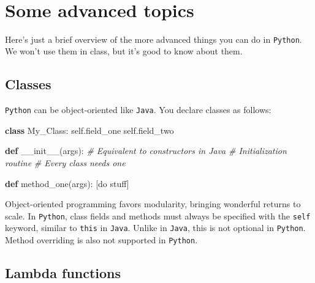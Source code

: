 \documentclass{article}
\newenvironment{Shaded}{}{}
\newcommand{\KeywordTok}[1]{\textcolor[rgb]{0.00,0.44,0.13}{\textbf{{#1}}}}
\newcommand{\CommentTok}[1]{\textcolor[rgb]{0.38,0.63,0.69}{\textit{{#1}}}}
\newcommand{\OtherTok}[1]{\textcolor[rgb]{0.00,0.44,0.13}{{#1}}}
\newcommand{\NormalTok}[1]{{#1}}
\begin{document}
    \begin{center}
    \end{center}
    { \hspace*{\fill} \\}
    

    \section{Some advanced topics}\label{some-advanced-topics}

Here's just a brief overview of the more advanced things you can do in
\texttt{Python}. We won't use them in class, but it's good to know about
them.

\subsection{Classes}\label{classes}

\texttt{Python} can be object-oriented like \texttt{Java}. You declare
classes as follows:

\begin{Shaded}
\begin{Highlighting}[]
\KeywordTok{class} \NormalTok{My_Class:}
    \OtherTok{self}\NormalTok{.field_one}
    \OtherTok{self}\NormalTok{.field_two}
    
    \KeywordTok{def} \OtherTok{__init__}\NormalTok{(args): }\CommentTok{# Equivalent to constructors in Java}
        \CommentTok{# Initialization routine}
        \CommentTok{# Every class needs one}
       
    \KeywordTok{def} \NormalTok{method_one(args):}
        \NormalTok{[do stuff]}
\end{Highlighting}
\end{Shaded}

Object-oriented programming favors modularity, bringing wonderful
returns to scale. In \texttt{Python}, class fields and methods must
always be specified with the \texttt{self} keyword, similar to
\texttt{this} in \texttt{Java}. Unlike in \texttt{Java}, this is not
optional in \texttt{Python}. Method overriding is also not supported in
\texttt{Python}.

\subsection{Lambda functions}\label{lambda-functions}
\end{document}
